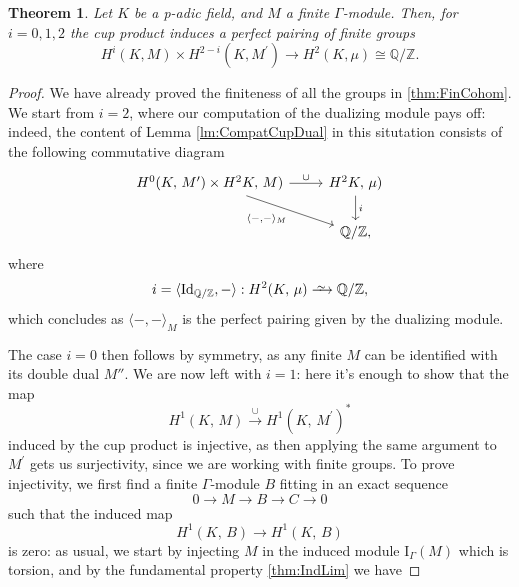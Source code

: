 \documentclass[a4paper]{report}
\def\Q{\mathbb{Q}}
\def\Z{\mathbb{Z}}
\def\K{K}
\renewcommand{\H}[3]{H^{#1}( #2, \, #3 )}
\newcommand{\HH}[2]{H^2 #1, \, #2 )}
\newcommand{\Ind}[2]{\mathrm{I}_{#1}(#2)}
\newcommand\Iso{\xrightarrow{
   \,\smash{\raisebox{-0.65ex}{\ensuremath{\scriptstyle\sim}}}\,}}
\theoremstyle{plain}
\newtheorem{theorem}{Theorem}[section]
\theoremstyle{definition}
\theoremstyle{remark}
\begin{document}
\begin{theorem}
    Let $\K$ be a p-adic field, and $M$ a finite $\Gamma$-module.
    Then, for $i=0,1,2$ the cup product induces a perfect pairing of finite groups
    \begin{equation*}
        H^i(\K, M) \times H^{2-i}(\K, M^{\prime}) \to H^2(\K, \mu) \cong \Q/\Z.
    \end{equation*}
\end{theorem}
\begin{proof}
    We have already proved the finiteness of all the groups in \eqref{thm:FinCohom}.
    We start from $i=2$, where our computation of the dualizing module pays off: indeed, the content of Lemma \eqref{lm:CompatCupDual}
    in this situtation consists of the following commutative diagram
    \begin{equation*}
        \begin{tikzcd}
            {\H{0}{\K}{M^\prime}  \times \HH{\K}{M}} \ar[swap, rd, "\langle - {,} - \rangle_M "] \ar[r, "\cup"] & \HH{\K}{\mu} \ar[d, "i"] \\
            & \Q/\Z,
        \end{tikzcd}
    \end{equation*}
    where
    \[
        i = \langle \operatorname{Id}_{\Q/\Z}, - \rangle : \H{2}{\K}{\mu} \Iso \Q/\Z,
    \]
    which concludes as $\langle -{,}- \rangle_M$ is the perfect pairing given by the dualizing module.

    The case $i=0$ then follows by symmetry, as any finite $M$ can be identified with its double dual $M''$.
    We are now left with $i=1$: here it's enough to show that the map
    \[
        \H{1}{\K}{M} \overset{\cup}{\to} \H{1}{\K}{M^\prime}^*
    \]
    induced by the cup product is injective, as then applying the same argument to $M^\prime$ gets us surjectivity, since we are working with finite groups.
    To prove injectivity, we first find a finite $\Gamma$-module $B$ fitting in an exact sequence
    \begin{equation}\label{eq:InjSeq}
        0\to M\to B\to C\to 0
    \end{equation}
    such that the induced map
    \[
        \H{1}{\K}{B}\to\H{1}{\K}{B}
    \]
    is zero:
    as usual, we start by injecting $M$ in the induced module $\Ind{\Gamma}{M}$ which is torsion, and by the fundamental property \eqref{thm:IndLim} we have


\end{proof}
\end{document}
